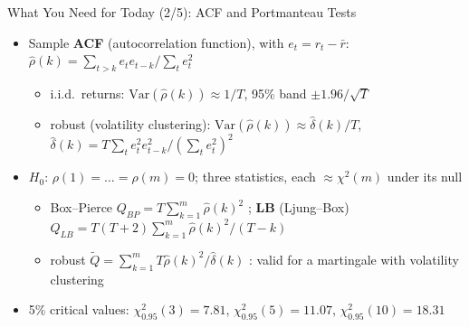 \begin{frame}{What You Need for Today (2/5): ACF and Portmanteau Tests}
\itemsize{\small}
\begin{itemize}
    \item Sample \textbf{ACF} (autocorrelation function), with $e_t = r_t - \bar r$: $\hat\rho(k) = \sum_{t>k} e_te_{t-k}\big/\sum_t e_t^2$
    \begin{itemize}
        \item i.i.d.\ returns: $\mathrm{Var}(\hat\rho(k)) \approx 1/T$, 95\% band $\pm 1.96/\sqrt{T}$
        \item robust (volatility clustering): $\mathrm{Var}(\hat\rho(k)) \approx \hat\delta(k)/T$, $\hat\delta(k) = T\sum_t e_t^2e_{t-k}^2/(\sum_t e_t^2)^2$ 
    \end{itemize}
    \item $H_0$: $\rho(1) = \dots = \rho(m) = 0$; three statistics, each $\approx \chi^2(m)$ under its null
    \begin{itemize}
        \item Box--Pierce $Q_{BP} = T\sum_{k=1}^m \hat\rho(k)^2$ ; \textbf{LB} (Ljung--Box) $Q_{LB} = T(T+2)\sum_{k=1}^m \hat\rho(k)^2/(T-k)$ 
        \item robust $\tilde Q = \sum_{k=1}^m T\hat\rho(k)^2/\hat\delta(k)$ : valid for a martingale with volatility clustering
    \end{itemize}
    \item 5\% critical values: $\chi^2_{0.95}(3) = 7.81$, $\chi^2_{0.95}(5) = 11.07$, $\chi^2_{0.95}(10) = 18.31$
\end{itemize}
\end{frame}

